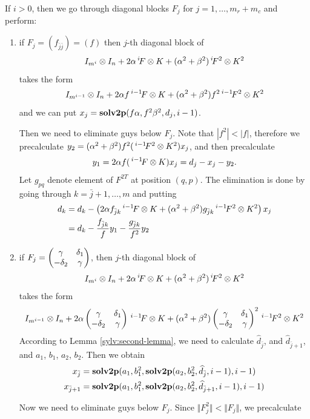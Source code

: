 \documentclass[11pt,a4paper]{article}
\begin{document}
If $i>0$, then we go through diagonal blocks $F_j$ for $j=1,\ldots, m_r+m_c$
and perform:
\begin{enumerate}
\item if $F_j=(f_{\bar j\bar j})=(f)$ then $j$-th diagonal block of
$$
I_{m^i}\otimes I_n + 2\alpha\,^i\!F\otimes K +
(\alpha^2+\beta^2)\,^i\!F^2\otimes K^2
$$
takes the form
$$
I_{m^{i-1}}\otimes I_n +2\alpha f\,^{i-1}\!F\otimes K +
(\alpha^2+\beta^2)f^2\,^{i-1}\!F^2\otimes K^2
$$
and we can put $x_j = \mathbf{solv2p}(f\alpha,f^2\beta^2,d_j,i-1)$.

Then we need to eliminate guys below $F_j$. Note that $|f^2|<|f|$,
therefore we precalculate $y_2=(\alpha^2+\beta^2)f^2(\,^{i-1}\!F^2\otimes K^2)x_j$,
and then precalculate
$$y_1 = 2\alpha f(\,^{i-1}\!F\otimes K)x_j = d_j-x_j-y_2.$$
Let $g_{pq}$ denote element of $F^{2T}$ at position $(q,p)$.
The elimination is done by going through $k=\bar j+1,\ldots, m$ and
putting
\begin{align*}
d_k &= d_k - \left(2\alpha f_{\bar j k}\,^{i-1}\!F\otimes K +
(\alpha^2+\beta^2)g_{\bar j k}\,^{i-1}\!F^2\otimes K^2\right)x_j\\
    &= d_k - \frac{f_{\bar j k}}{f}y_1 -
       \frac{g_{\bar j k}}{f^2}y_2
\end{align*}

\item if $F_j=\begin{pmatrix}\gamma&\delta_1\cr -\delta_2&\gamma\end{pmatrix}$,
then $j$-th diagonal block of
$$
I_{m^i}\otimes I_n + 2\alpha\,^i\!F\otimes K +
(\alpha^2+\beta^2)\,^i\!F^2\otimes K^2
$$
takes the form
$$
I_{m^{i-1}}\otimes I_n +2\alpha
\begin{pmatrix}\gamma&\delta_1\cr -\delta_2&\gamma\end{pmatrix}\,^{i-1}\!F\otimes K
+(\alpha^2+\beta^2)
\begin{pmatrix}\gamma&\delta_1\cr -\delta_2&\gamma\end{pmatrix}^2\,^{i-1}\!F^2\otimes K^2
$$
According to Lemma \ref{sylv:second-lemma}, we need to calculate
$\widehat{d}_{\bar j}$, and $\widehat{d}_{\bar j+1}$, and $a_1$,
$b_1$, $a_2$, $b_2$. Then we obtain
\begin{align*}
x_{\bar j}&=
 \mathbf{solv2p}(a_1,b_1^2,\mathbf{solv2p}(a_2,b_2^2,\widehat{d}_{\bar j},i-1),i-1)\\
x_{\bar j+1}&=
 \mathbf{solv2p}(a_1,b_1^2,\mathbf{solv2p}(a_2,b_2^2,\widehat{d}_{\bar j+1},i-1),i-1)
\end{align*}

Now we need to eliminate guys below $F_j$. Since $\Vert F^2_j\Vert <
\Vert F_j\Vert$, we precalculate


\end{enumerate}
\end{document}
